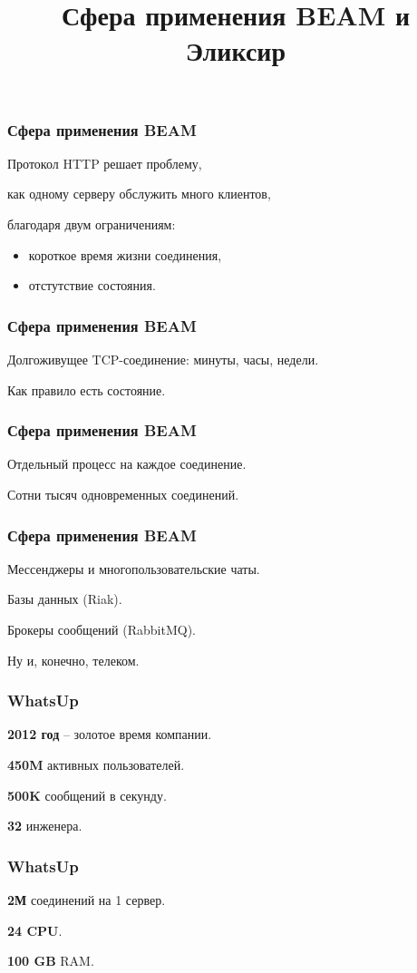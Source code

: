 \documentclass[10pt]{beamer}
\title{Сфера применения BEAM и Эликсир}
\begin{document}
\begin{frame}
  \frametitle{Сфера применения BEAM}
  Протокол HTTP решает проблему,
  \par \bigskip
  как одному серверу обслужить много клиентов,
  \par \bigskip
  благодаря двум ограничениям:
  \par \bigskip
  \begin{itemize}
    \item короткое время жизни соединения,
    \item отстутствие состояния.
  \end{itemize}
\end{frame}

\begin{frame}
  \frametitle{Сфера применения BEAM}
  Долгоживущее TCP-соединение: минуты, часы, недели.
  \par \bigskip
  Как правило есть состояние.
\end{frame}

\begin{frame}
  \frametitle{Сфера применения BEAM}
  Отдельный процесс на каждое соединение.
  \par \bigskip
  Сотни тысяч одновременных соединений.
\end{frame}

\begin{frame}
  \frametitle{Сфера применения BEAM}
  Мессенджеры и многопользовательские чаты.
  \par \bigskip
  Базы данных (Riak).
  \par \bigskip
  Брокеры сообщений (RabbitMQ).
  \par \bigskip
  Ну и, конечно, телеком.
\end{frame}

\begin{frame}
  \frametitle{WhatsUp}
  \textbf{2012 год} -- золотое время компании.
  \par \bigskip
  \textbf{450M} активных пользователей.
  \par \bigskip
  \textbf{500K} сообщений в секунду.
  \par \bigskip
  \textbf{32} инженера.
\end{frame}

\begin{frame}
  \frametitle{WhatsUp}
  \textbf{2М} соединений на 1 сервер.
  \par \bigskip
  \textbf{24 CPU}.
  \par \bigskip
  \textbf{100 GB} RAM.
\end{frame}
\end{document}
